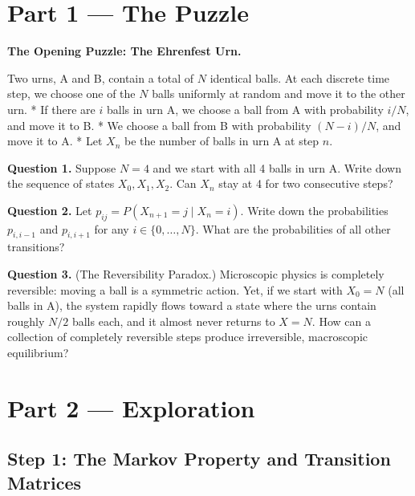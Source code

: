 \documentclass[12pt, a4paper]{article}
\begin{document}
\newpage

\section{Part 1 \texorpdfstring{---}{--} The Puzzle}

\begin{puzzlebox}
\textbf{The Opening Puzzle: The Ehrenfest Urn.}

Two urns, A and B, contain a total of $N$ identical balls. At each discrete time step, we choose one of the $N$ balls uniformly at random and move it to the other urn.
* If there are $i$ balls in urn A, we choose a ball from A with probability $i/N$, and move it to B.
* We choose a ball from B with probability $(N-i)/N$, and move it to A.
* Let $X_n$ be the number of balls in urn A at step $n$.

\medskip
\textbf{Question 1.} Suppose $N = 4$ and we start with all 4 balls in urn A. Write down the sequence of states $X_0, X_1, X_2$. Can $X_n$ stay at 4 for two consecutive steps?

\textbf{Question 2.} Let $p_{ij} = P(X_{n+1} = j \mid X_n = i)$. Write down the probabilities $p_{i, i-1}$ and $p_{i, i+1}$ for any $i \in \{0, \dots, N\}$. What are the probabilities of all other transitions?

\textbf{Question 3.} (The Reversibility Paradox.) Microscopic physics is completely reversible: moving a ball is a symmetric action. Yet, if we start with $X_0 = N$ (all balls in A), the system rapidly flows toward a state where the urns contain roughly $N/2$ balls each, and it almost never returns to $X=N$. How can a collection of completely reversible steps produce irreversible, macroscopic equilibrium?
\end{puzzlebox}

\newpage

\section{Part 2 \texorpdfstring{---}{--} Exploration}

\subsection{Step 1: The Markov Property and Transition Matrices}
\end{document}
